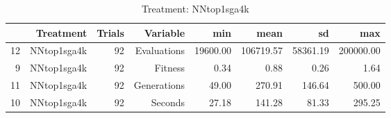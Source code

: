 \begin{table}[ht]
\centering
\begin{tabular}{rrrrrrrr}
  \hline
 & Treatment & Trials & Variable & min & mean & sd & max \\ 
  \hline
12 & NNtop1sga4k &  92 & Evaluations & 19600.00 & 106719.57 & 58361.19 & 200000.00 \\ 
  9 & NNtop1sga4k &  92 & Fitness & 0.34 & 0.88 & 0.26 & 1.64 \\ 
  11 & NNtop1sga4k &  92 & Generations & 49.00 & 270.91 & 146.64 & 500.00 \\ 
  10 & NNtop1sga4k &  92 & Seconds & 27.18 & 141.28 & 81.33 & 295.25 \\ 
   \hline
\end{tabular}
\caption{Treatment: NNtop1sga4k} 
\end{table}
